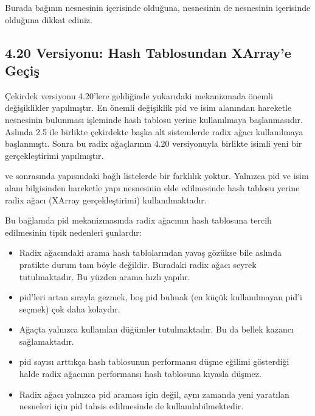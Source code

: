 \documentclass[a4paper,10pt,turkish]{sphinxmanual}
\begin{document}
\sphinxAtStartPar
Burada  bağının  nesnesinin içerisinde olduğuna,  nesnesinin de 
nesnesinin içerisinde olduğuna dikkat ediniz.


\subsection{4.20 Versiyonu: Hash Tablosundan XArray’e Geçiş}
\label{\detokenize{processcontrolblock:versiyonu-hash-tablosundan-xarray-e-gecis}}
\sphinxAtStartPar
Çekirdek versiyonu 4.20’lere geldiğinde yukarıdaki mekanizmada önemli değişiklikler yapılmıştır. En
önemli değişiklik pid ve isim alanından hareketle  nesnesinin bulunması işleminde hash tablosu
yerine  kullanılmaya başlanmasıdır. Aslında 2.5 ile birlikte çekirdekte başka alt
sistemlerde radix ağacı kullanılmaya başlanmıştı. Sonra bu radix ağaçlarının 4.20 versiyonuyla birlikte
 isimli yeni bir gerçekleştirimi yapılmıştır.

 ve sonrasında  yapısındaki bağlı listelerde bir farklılık yoktur. Yalnızca pid ve isim alanı
bilgisinden hareketle  yapı nesnesinin elde edilmesinde hash tablosu yerine radix ağacı (XArray
gerçekleştirimi) kullanılmaktadır.

\sphinxAtStartPar
Bu bağlamda pid mekanizmasında radix ağacının hash tablosuna tercih edilmesinin tipik nedenleri şunlardır:
\begin{itemize}
\item {} 
\sphinxAtStartPar
Radix ağacındaki arama hash tablolarından yavaş gözükse bile aslında pratikte durum tam böyle
değildir. Buradaki radix ağacı seyrek tutulmaktadır. Bu yüzden arama hızlı yapılır.

\item {} 
\sphinxAtStartPar
pid’leri artan sırayla gezmek, boş pid bulmak (en küçük kullanılmayan pid’i seçmek) çok daha
kolaydır.

\item {} 
\sphinxAtStartPar
Ağaçta yalnızca kullanılan düğümler tutulmaktadır. Bu da bellek kazancı sağlamaktadır.

\item {} 
\sphinxAtStartPar
pid sayısı arttıkça hash tablosunun performansı düşme eğilimi gösterdiği halde radix ağacının
performansı hash tablosuna kıyasla düşmez.

\item {} 
\sphinxAtStartPar
Radix ağacı yalnızca pid araması için değil, aynı zamanda yeni yaratılan  nesneleri
için pid tahsis edilmesinde de kullanılabilmektedir.

\end{itemize}
\end{document}
